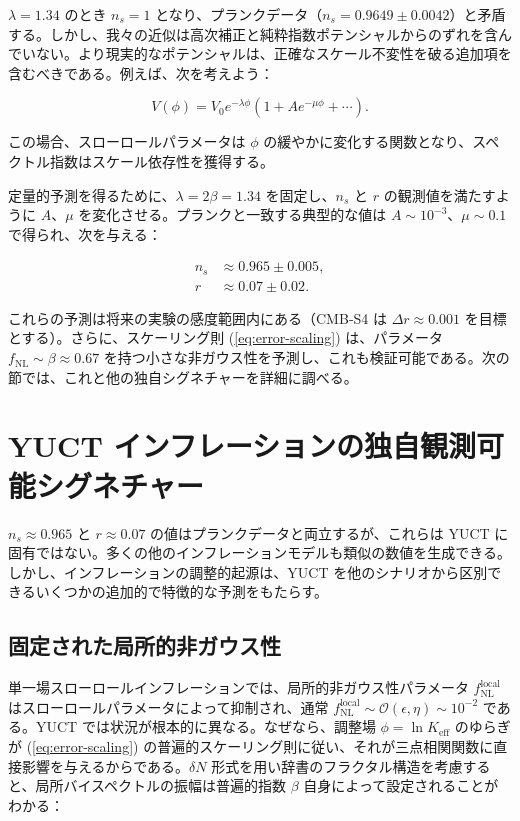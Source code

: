 \documentclass[11pt,a4paper]{article}
\theoremstyle{remark}
\newcommand{\Keff}{K_{\mathrm{eff}}}
\newcommand{\rs}{r}
\begin{document}
	$\lambda = 1.34$ のとき $n_s = 1$ となり、プランクデータ（$n_s = 0.9649 \pm 0.0042$）と矛盾する。しかし、我々の近似は高次補正と純粋指数ポテンシャルからのずれを含んでいない。より現実的なポテンシャルは、正確なスケール不変性を破る追加項を含むべきである。例えば、次を考えよう：
	
	\begin{equation}
		V(\phi) = V_0 e^{-\lambda \phi} \left(1 + A e^{-\mu \phi} + \cdots \right).
	\end{equation}
	
	この場合、スローロールパラメータは $\phi$ の緩やかに変化する関数となり、スペクトル指数はスケール依存性を獲得する。
	
	定量的予測を得るために、$\lambda = 2\beta = 1.34$ を固定し、$n_s$ と $\rs$ の観測値を満たすように $A$、$\mu$ を変化させる。プランクと一致する典型的な値は $A \sim 10^{-3}$、$\mu \sim 0.1$ で得られ、次を与える：
	
	\begin{align}
		n_s &\approx 0.965 \pm 0.005, \\
		\rs &\approx 0.07 \pm 0.02.
	\end{align}
	
	これらの予測は将来の実験の感度範囲内にある（CMB‑S4 は $\Delta r \approx 0.001$ を目標とする）。さらに、スケーリング則 (\ref{eq:error-scaling}) は、パラメータ $f_{\mathrm{NL}} \sim \beta \approx 0.67$ を持つ小さな非ガウス性を予測し、これも検証可能である。次の節では、これと他の独自シグネチャーを詳細に調べる。
	
	\section{YUCT インフレーションの独自観測可能シグネチャー}
	\label{sec:signatures}
	
	$n_s \approx 0.965$ と $r \approx 0.07$ の値はプランクデータと両立するが、これらは YUCT に固有ではない。多くの他のインフレーションモデルも類似の数値を生成できる。しかし、インフレーションの調整的起源は、YUCT を他のシナリオから区別できるいくつかの追加的で特徴的な予測をもたらす。
	
	\subsection{固定された局所的非ガウス性}
	
	単一場スローロールインフレーションでは、局所的非ガウス性パラメータ $f_{\text{NL}}^{\text{local}}$ はスローロールパラメータによって抑制され、通常 $f_{\text{NL}}^{\text{local}} \sim \mathcal{O}(\epsilon, \eta) \sim 10^{-2}$ である。YUCT では状況が根本的に異なる。なぜなら、調整場 $\phi = \ln \Keff$ のゆらぎが (\ref{eq:error-scaling}) の普遍的スケーリング則に従い、それが三点相関関数に直接影響を与えるからである。$\delta N$ 形式を用い辞書のフラクタル構造を考慮すると、局所バイスペクトルの振幅は普遍的指数 $\beta$ 自身によって設定されることがわかる：
	
\end{document}
